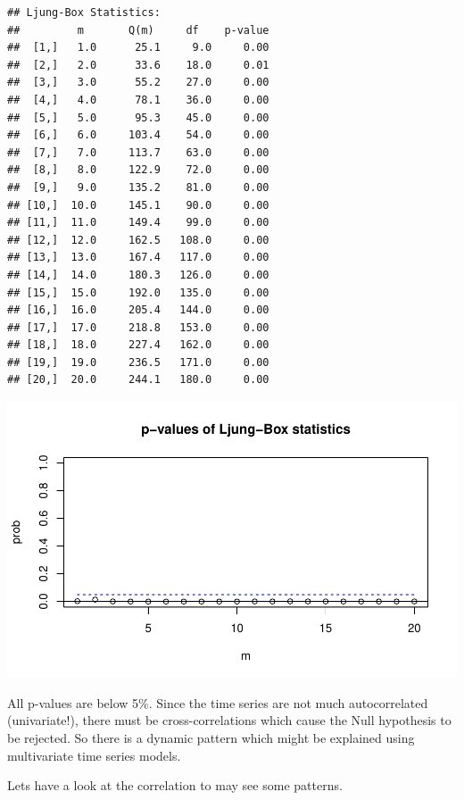 \documentclass[12pt,a4paper]{article}
\begin{document}
\begin{verbatim}
## Ljung-Box Statistics:  
##         m       Q(m)     df    p-value
##  [1,]   1.0      25.1     9.0     0.00
##  [2,]   2.0      33.6    18.0     0.01
##  [3,]   3.0      55.2    27.0     0.00
##  [4,]   4.0      78.1    36.0     0.00
##  [5,]   5.0      95.3    45.0     0.00
##  [6,]   6.0     103.4    54.0     0.00
##  [7,]   7.0     113.7    63.0     0.00
##  [8,]   8.0     122.9    72.0     0.00
##  [9,]   9.0     135.2    81.0     0.00
## [10,]  10.0     145.1    90.0     0.00
## [11,]  11.0     149.4    99.0     0.00
## [12,]  12.0     162.5   108.0     0.00
## [13,]  13.0     167.4   117.0     0.00
## [14,]  14.0     180.3   126.0     0.00
## [15,]  15.0     192.0   135.0     0.00
## [16,]  16.0     205.4   144.0     0.00
## [17,]  17.0     218.8   153.0     0.00
## [18,]  18.0     227.4   162.0     0.00
## [19,]  19.0     236.5   171.0     0.00
## [20,]  20.0     244.1   180.0     0.00
\end{verbatim}

\includegraphics{exercise_1_files/figure-latex/unnamed-chunk-6-1.pdf}

All p-values are below 5\%. Since the time series are not much
autocorrelated (univariate!), there must be cross-correlations which
cause the Null hypothesis to be rejected. So there is a dynamic pattern
which might be explained using multivariate time series models.

Lets have a look at the correlation to may see some patterns.
\end{document}
